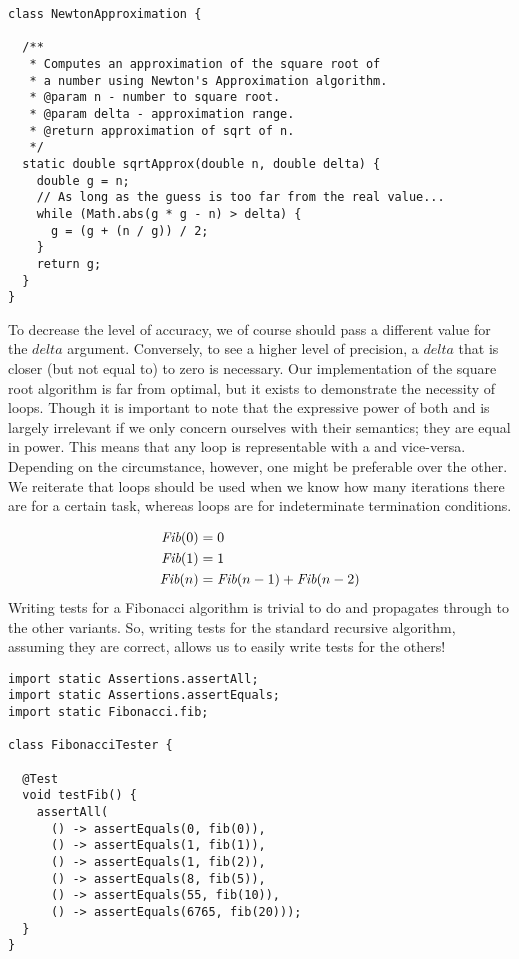 \begin{lstlisting}[language=MyJava]
class NewtonApproximation {

  /**
   * Computes an approximation of the square root of
   * a number using Newton's Approximation algorithm.
   * @param n - number to square root.
   * @param delta - approximation range.
   * @return approximation of sqrt of n.
   */
  static double sqrtApprox(double n, double delta) {
    double g = n;
    // As long as the guess is too far from the real value...
    while (Math.abs(g * g - n) > delta) {
      g = (g + (n / g)) / 2;
    }
    return g;
  }
}
\end{lstlisting}

To decrease the level of accuracy, we of course should pass a different value for the $\mathit{delta}$ argument. Conversely, to see a higher level of precision, a $\mathit{delta}$ that is closer (but not equal to) to zero is necessary. Our implementation of the square root algorithm is far from optimal, but it exists to demonstrate the necessity of  loops. Though it is important to note that the expressive power of both  and  is largely irrelevant if we only concern ourselves with their semantics; they are equal in power. This means that any  loop is representable with a  and vice-versa. Depending on the circumstance, however, one might be preferable over the other. We reiterate that  loops should be used when we know how many iterations there are for a certain task, whereas  loops are for indeterminate termination conditions. 

\begin{align*}
  \emph{Fib}(0) &= 0\\
  \emph{Fib}(1) &= 1\\
  \emph{Fib}(n) &= \emph{Fib}(n - 1) + \emph{Fib}(n - 2)
\end{align*}
Writing tests for a Fibonacci algorithm is trivial to do and propagates through to the other variants. So, writing tests for the standard recursive algorithm, assuming they are correct, allows us to easily write tests for the others!

\begin{lstlisting}[language=MyJava]
import static Assertions.assertAll;
import static Assertions.assertEquals;
import static Fibonacci.fib;

class FibonacciTester {

  @Test
  void testFib() {
    assertAll(
      () -> assertEquals(0, fib(0)),
      () -> assertEquals(1, fib(1)),
      () -> assertEquals(1, fib(2)),
      () -> assertEquals(8, fib(5)),
      () -> assertEquals(55, fib(10)),
      () -> assertEquals(6765, fib(20)));
  }
}
\end{lstlisting}


